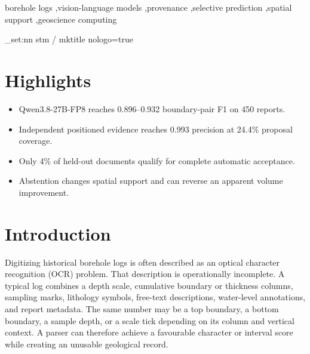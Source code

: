 \documentclass[a4paper,fleqn]{cas-sc}
\begin{document}
\begin{keywords}
borehole logs \sep vision-language models \sep provenance \sep selective prediction \sep spatial support \sep geoscience computing
\end{keywords}
\ExplSyntaxOn
\keys_set:nn { stm / mktitle } { nologo=true }
\ExplSyntaxOff
\begingroup
\hfuzz=120pt
\maketitle
\endgroup
{}
\printcredits
\doublespacing

\section*{Highlights}
\begin{itemize}
\item Qwen3.8-27B-FP8 reaches 0.896--0.932 boundary-pair F1 on 450 reports.
\item Independent positioned evidence reaches 0.993 precision at 24.4\% proposal coverage.
\item Only 4\% of held-out documents qualify for complete automatic acceptance.
\item Abstention changes spatial support and can reverse an apparent volume improvement.
\end{itemize}
\section{Introduction}

Digitizing historical borehole logs is often described as an optical character recognition (OCR) problem. That description is operationally incomplete. A typical log combines a depth scale, cumulative boundary or thickness columns, sampling marks, lithology symbols, free-text descriptions, water-level annotations, and report metadata. The same number may be a top boundary, a bottom boundary, a sample depth, or a scale tick depending on its column and vertical context. A parser can therefore achieve a favourable character or interval score while creating an unusable geological record.
\end{document}
